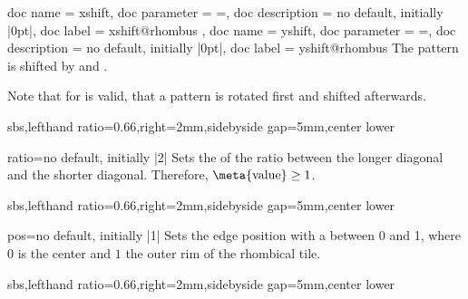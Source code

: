 \documentclass[a4paper,11pt]{article}
\begin{document}
\begin{myvoid}
\begin{docPatternKeys}
  {
    {
      doc name        = xshift,
      doc parameter   = {=},
      doc description = {no default, initially |0pt|},
      doc label       = xshift@rhombus
    },
    {
      doc name        = yshift,
      doc parameter   = {=},
      doc description = {no default, initially |0pt|},
      doc label       = yshift@rhombus
    }
  }
  The pattern is shifted by  and .
  \par
  Note that for  is valid, that a pattern is rotated first and shifted afterwards.
\begin{dispExample*}{sbs,lefthand ratio=0.66,right=2mm,sidebyside gap=5mm,center lower}
\end{dispExample*}
\end{docPatternKeys}



\begin{docPatternKey}[][doc label=ratio@rhombus]{ratio}{=}{no default, initially |2|}
  Sets the  of the ratio
  between the longer diagonal and the shorter diagonal.
  Therefore, $\text{\meta{value}}\ge 1$.

\begin{dispExample*}{sbs,lefthand ratio=0.66,right=2mm,sidebyside gap=5mm,center lower}
\end{dispExample*}
\end{docPatternKey}



\begin{docPatternKey}[][doc label=pos@rhombus]{pos}{=}{no default, initially |1|}
  Sets the edge position with a  between 0 and 1, where $0$ is
  the center and $1$ the outer rim of the rhombical tile.

\begin{dispExample*}{sbs,lefthand ratio=0.66,right=2mm,sidebyside gap=5mm,center lower}
\end{dispExample*}
\end{docPatternKey}


\end{myvoid}
\end{document}
